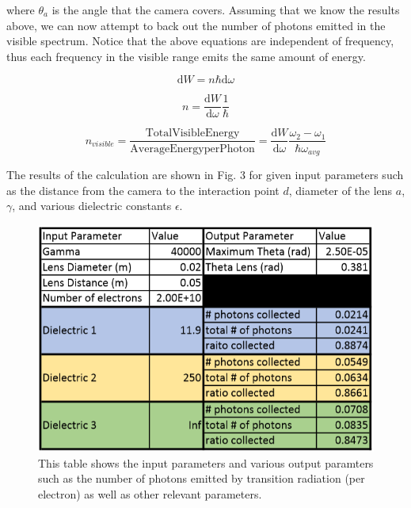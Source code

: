 \documentclass[12pt]{article}
\begin{document}
where $\theta_a$ is the angle that the camera covers. Assuming that we know the results above, we can now attempt to back out the number of photons emitted in the visible spectrum. Notice that the above equations are independent of frequency, thus each frequency in the visible range emits the same amount of energy.

\begin{equation}
\mathrm{d} W=n \hbar \mathrm{d} \omega
\end{equation}

\begin{equation}
n=\frac{\mathrm{d} W}{\mathrm{d} \omega} \frac{1}{\hbar}
\end{equation}

\begin{equation}
n_{visible}=\frac{\mathrm{Total Visible Energy}}{\mathrm{Average Energy per Photon}}=\frac{\mathrm{d} W}{\mathrm{d} \omega} \frac{\omega_2 - \omega_1}{\hbar \omega_{avg}}
\end{equation}

The results of the calculation are shown in Fig. 3 for given input parameters such as the distance from the camera to the interaction point $d$, diameter of the lens $a$, $\gamma$, and various dielectric constants $\epsilon$.

\begin{figure}
\begin{center}
\includegraphics[scale=0.5]{TransData.PNG}
\caption{This table shows the input parameters and various output paramters such as the number of photons emitted by transition radiation (per electron) as well as other relevant parameters.}
\end{center}
\end{figure}
\end{document}
